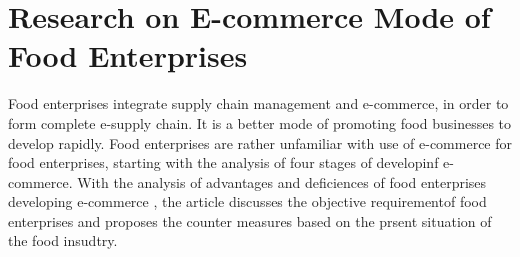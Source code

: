\documentclass[12pt,a4paper]{report}
\begin{document}
\section{Research on E-commerce Mode of Food Enterprises}
\hspace{0.25cm}
\par
Food enterprises integrate supply chain management and e-commerce, in order to form complete e-supply chain. It is a better mode of promoting food businesses to develop rapidly. Food enterprises are rather unfamiliar with use of e-commerce for food enterprises, starting with the analysis of four stages of developinf e-commerce. With the analysis of advantages and deficiences of food enterprises developing e-commerce , the article discusses the objective requirementof food enterprises and proposes the counter measures based on the prsent situation of the food insudtry.  
\end{document}
